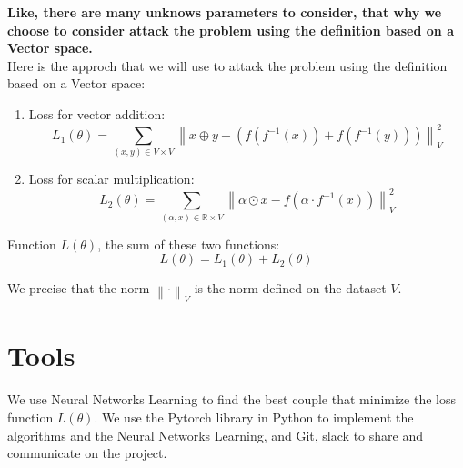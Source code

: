 \documentclass{report}
\begin{document}
    \textbf{Like, there are many unknows parameters to consider, that why we choose to consider attack the problem using the definition based on a Vector space.}\\

    
    Here is the approch that we will use to attack the problem using the definition based on a Vector space:


    \begin{enumerate}
        \item Loss for vector addition:
        \[
            L_1(\theta) = \sum_{(x, y) \in V \times V} \left\lVert x \oplus y - \left(f(f^{-1}(x)) + f(f^{-1}(y))\right) \right\rVert_{V}^2
        \]
        \item Loss for scalar multiplication:
        \[
            L_2(\theta) = \sum_{(\alpha, x) \in \mathbb{R} \times V} \left\lVert \alpha \odot x - f(\alpha \cdot f^{-1}(x)) \right\rVert_{V}^2
        \]
    \end{enumerate}

    Function $L(\theta)$, the sum of these two functions:
    \[
    L(\theta) = L_1(\theta) + L_2(\theta)
    \]

    We  precise that the norm $\left\lVert \cdot \right\rVert_{V}$ is the norm defined on the dataset $V$.

\section{Tools}
    We use Neural Networks Learning to find the best couple that minimize the loss function $L(\theta)$.
    We use the Pytorch library in Python to implement the algorithms and the Neural Networks Learning, and Git, slack to share and communicate on the project.
\end{document}
